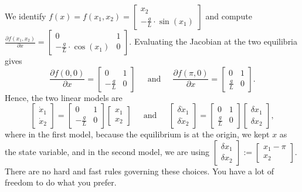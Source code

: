 \begin{enumerate}
We identify $f(x) = f(x_1, x_2) = \left[\begin{array}{c} x_2 \\  -\frac{g}{L}  \cdot \sin(x_1)\end{array} \right]$ and compute $\frac{\partial f(x_1, x_2)}{\partial x} =  \left[\begin{array}{cc} 0 & 1 \\  -\frac{g}{L}  \cdot \cos(x_1) & 0\end{array} \right]$. Evaluating the Jacobian at the two equilibria gives
$$\frac{\partial f(0, 0)}{\partial x} =  \left[\begin{array}{cc} 0 & 1 \\  -\frac{g}{L} & 0\end{array} \right] \quad ~~\text{and}~~\quad
\frac{\partial f(\pi, 0)}{\partial x}= \left[\begin{array}{cc} 0 & 1 \\  \frac{g}{L} & 0\end{array} \right]. $$
Hence, the two linear models are 
$$ \left[ \begin{array}{c} \dot{x}_1 \\ \dot{x}_2 \end{array} \right] =  \left[\begin{array}{cc} 0 & 1 \\  -\frac{g}{L} & 0\end{array} \right] \left[ \begin{array}{c}{x}_1 \\ {x}_2 \end{array} \right] \quad ~~\text{and}~~\quad
\left[ \begin{array}{c} \delta \dot{x}_1 \\ \delta \dot{x}_2 \end{array} \right] =  \left[\begin{array}{cc} 0 & 1 \\  \frac{g}{L} & 0\end{array} \right] \left[ \begin{array}{c}\delta {x}_1 \\ \delta {x}_2 \end{array} \right], $$
where in the first model, because the equilibrium is at the origin, we kept $x$ as the state variable, and in the second model, we are using $\left[ \begin{array}{c}\delta {x}_1 \\ \delta {x}_2 \end{array} \right]:= \left[ \begin{array}{c} {x}_1 - \pi\\{x}_2 \end{array} \right].$ There are no hard and fast rules governing these choices. You have a lot of freedom to do what you prefer.\\


\end{enumerate}
